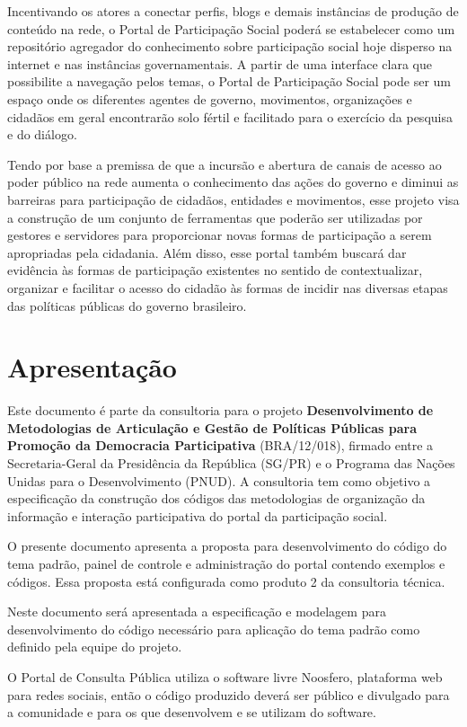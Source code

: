 \documentclass[[a4paper,11pt]{article}
\begin{document}
Incentivando os atores a conectar perfis, blogs e demais instâncias de
produção
de conteúdo na rede, o Portal de Participação Social poderá se
estabelecer como um
repositório agregador do conhecimento sobre participação social hoje
disperso na
internet e nas instâncias governamentais. A partir de uma interface
clara que possibilite
a navegação pelos temas, o Portal de Participação Social pode ser um
espaço onde os
diferentes agentes de governo, movimentos, organizações e cidadãos em
geral
encontrarão solo fértil e facilitado para o exercício da pesquisa e do
diálogo.

Tendo por base a premissa de que a incursão e abertura de canais de
acesso ao
poder público na rede aumenta o conhecimento das ações do governo e
diminui as
barreiras para participação de cidadãos, entidades e movimentos, esse
projeto visa a
construção de um conjunto de ferramentas que poderão ser utilizadas por
gestores e
servidores para proporcionar novas formas de participação a serem
apropriadas pela
cidadania. Além disso, esse portal também buscará dar evidência às
formas de
participação existentes no sentido de contextualizar, organizar e
facilitar o acesso do
cidadão às formas de incidir nas diversas etapas das políticas públicas
do governo
brasileiro.

\section{Apresentação}

Este documento é parte da consultoria para o projeto
\textbf{Desenvolvimento de Metodologias de Articulação e Gestão de
Políticas Públicas para Promoção da Democracia Participativa}
(BRA/12/018), firmado entre a Secretaria-Geral da Presidência da República
(SG/PR) e o Programa das Nações Unidas para o Desenvolvimento (PNUD).
A consultoria tem como objetivo a especificação da construção dos códigos das
metodologias de organização da informação e interação participativa do
portal da participação social.

O presente documento apresenta a proposta para
desenvolvimento do código do tema padrão, painel de controle e
administração do portal contendo exemplos e códigos. 
Essa proposta está configurada como produto 2 da consultoria técnica.

Neste documento será apresentada a especificação e
modelagem para desenvolvimento do código necessário para aplicação do
tema padrão como definido pela equipe do projeto.

O Portal de Consulta Pública utiliza o software livre Noosfero,
plataforma web para redes sociais, então o código produzido deverá ser público
e divulgado para a comunidade e para os que desenvolvem e se utilizam do
software.
\end{document}
